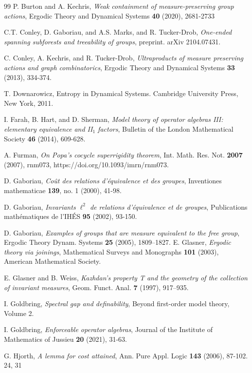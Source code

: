 \documentclass[12pt]{amsart}
\theoremstyle{definition}
\begin{document}
\begin{thebibliography}{99}
 P. Burton and A. Kechris, \emph{Weak containment of measure-preserving group actions}, Ergodic Theory and Dynamical Systems \textbf{40} (2020), 2681-2733

 C.T. Conley, D. Gaboriau, and A.S. Marks, and R. Tucker-Drob, \emph{One-ended spanning subforests and treeability of groups}, preprint.  arXiv 2104.07431. 

 C. Conley, A. Kechris, and R. Tucker-Drob, \emph{Ultraproducts of measure preserving actions and graph combinatorics}, Ergodic Theory and Dynamical Systems \textbf{33} (2013), 334-374.

 T. Downarowicz, Entropy in Dynamical Systems. Cambridge University Press, New York, 2011.

 I. Farah, B. Hart, and D. Sherman, \emph{Model theory of operator algebras III:  elementary equivalence and II$_1$ factors}, Bulletin of the London Mathematical Society \textbf{46} (2014), 609-628.

 A. Furman, \emph{On Popa's cocycle superrigidity theorem}, Int. Math. Res. Not. \textbf{2007} (2007), rnm073, https://doi.org/10.1093/imrn/rnm073.

D. Gaboriau, \emph{Co{\^{u}}t des relations d’\'{e}quivalence et des groupes}, Inventiones mathematicae \textbf{139}, no. 1 (2000), 41-98.

D. Gaboriau, \emph{Invariants $\ell^ 2$ de relations d’équivalence et de groupes}, Publications mathématiques de l'IH\'{E}S \textbf{95} (2002), 93-150.

 D. Gaboriau, \emph{Examples of groups that are measure equivalent to the free group}, Ergodic Theory Dynam. Systems \textbf{25} (2005), 1809–1827.
 E. Glasner, \emph{Ergodic theory via joinings}, Mathematical Surveys and Monographs \textbf{101} (2003), American Mathematical Society.

 E. Glasner and B. Weiss, \emph{Kazhdan’s property T and the geometry of the collection of invariant measures}, Geom. Funct. Anal. \textbf{7} (1997), 917–935.

 I. Goldbring, \emph{Spectral gap and definability}, Beyond first-order model theory, Volume 2.

 I. Goldbring, \emph{Enforceable operator algebras}, Journal of the Institute of Mathematics of Jussieu \textbf{20} (2021), 31-63.

 G. Hjorth, \emph{A lemma for cost attained}, Ann. Pure Appl. Logic \textbf{143} (2006), 87-102.
24, 31


\end{thebibliography}
\end{document}
